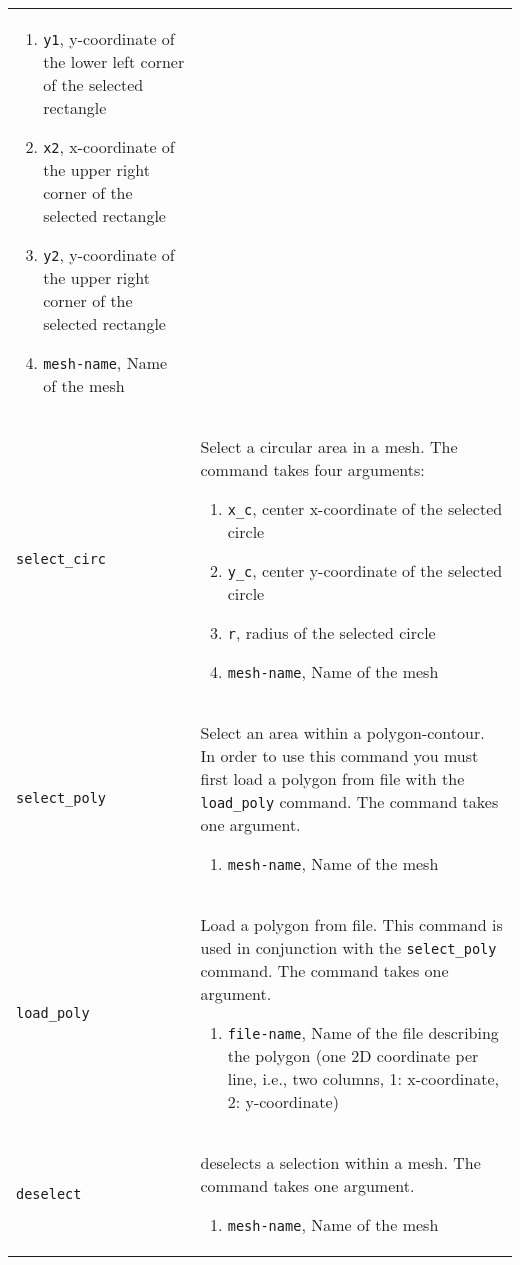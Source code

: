 \documentclass[noshowpacs,preprintnumbers,amsmath,amssymb, letter]{revtex4}
\begin{document}
\begin{longtable}{p{}p{}}
\begin{enumerate}
\item \texttt{y1}, y-coordinate of the lower left corner of the selected rectangle
\item \texttt{x2}, x-coordinate of the upper right corner of the selected rectangle
\item \texttt{y2}, y-coordinate of the upper right corner of the selected rectangle
\item \texttt{mesh-name}, Name of the mesh
\end{enumerate}\\
\texttt{select\_circ}	& Select a circular area in a mesh. The command takes four arguments:
\begin{enumerate}
\item \texttt{x\_c}, center x-coordinate of the selected circle
\item \texttt{y\_c}, center y-coordinate of the selected circle
\item \texttt{r}, radius of the selected circle
\item \texttt{mesh-name}, Name of the mesh
\end{enumerate}\\
\texttt{select\_poly}	& Select an area within a polygon-contour. In order to use this command you must first load a polygon from file with the \texttt{load\_poly} command. The command takes one argument.
\begin{enumerate}
\item \texttt{mesh-name}, Name of the mesh
\end{enumerate}\\
\texttt{load\_poly}	& Load a polygon from file. This command is used in conjunction with the \texttt{select\_poly} command. The command takes one argument.
\begin{enumerate}
\item \texttt{file-name}, Name of the file describing the polygon (one 2D coordinate per line, i.e., two columns, 1: x-coordinate, 2: y-coordinate)
\end{enumerate}\\
\texttt{deselect}	& deselects a selection within a mesh. The command takes one argument.
\begin{enumerate}
\item \texttt{mesh-name}, Name of the mesh

\end{enumerate}
\end{longtable}
\end{document}
